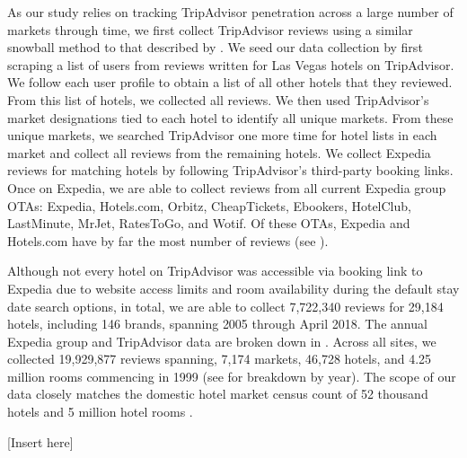 \documentclass[mksc,blindrev]{informs3} %
\begin{document}
As our study relies on tracking TripAdvisor penetration across a large number of markets through time, we first collect TripAdvisor reviews using a similar snowball method to that described by \citet{wang2018and}. We seed our data collection by first scraping a list of users from reviews written for Las Vegas hotels on TripAdvisor. We follow each user profile to obtain a list of all other hotels that they reviewed. From this list of hotels, we collected all reviews. We then used TripAdvisor's market designations tied to each hotel to identify all unique markets. From these unique markets, we searched TripAdvisor one more time for hotel lists in each market and collect all reviews from the remaining hotels. We collect Expedia reviews for matching hotels by following TripAdvisor's third-party booking links. Once on Expedia, we are able to collect reviews from all current Expedia group OTAs: Expedia, Hotels.com, Orbitz, CheapTickets, Ebookers, HotelClub, LastMinute, MrJet, RatesToGo, and Wotif. Of these OTAs, Expedia and Hotels.com have by far the most number of reviews (see ).

Although not every hotel on TripAdvisor was accessible via booking link to Expedia due to website access limits and room availability during the default stay date search options, in total, we are able to collect 7,722,340 reviews for 29,184 hotels, including 146 brands, spanning 2005 through April 2018. The annual Expedia group and TripAdvisor data are broken down in . Across all sites, we collected 19,929,877 reviews spanning, 7,174 markets, 46,728 hotels, and 4.25 million rooms commencing in 1999 (see  for breakdown by year). The scope of our data closely matches the domestic hotel market census count of 52 thousand hotels and 5 million hotel rooms \citep{hotelnews2015}. 

[Insert  here]
\end{document}
